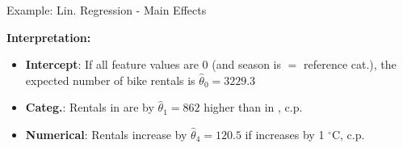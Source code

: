 \documentclass[10pt,compress,t,notes=noshow, xcolor=table]{beamer}
\begin{document}
\begin{frame}{Example: Lin. Regression - Main Effects}
\lz


%
\textbf{Interpretation:}

\begin{itemize}[<+->]
    \item \textbf{Intercept}:
    If all feature values are 0 (and season is  $\hat =$ reference cat.), the expected number of bike rentals is $\hat\theta_0 = 3229.3$
    \item \textbf{Categ.}: Rentals in  are by $\hat\theta_1 = 862$ higher than in , c.p.
    \item \textbf{Numerical}: Rentals increase by $\hat\theta_4 = 120.5$ if  increases by 1 $^{\circ}$C, c.p.

\end{itemize}
\end{frame}

\endlecture
\end{document}
